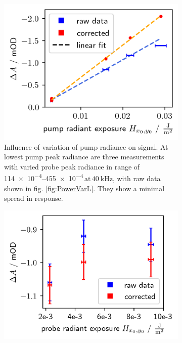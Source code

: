 \documentclass[twoside,openright]{scrreprt}
\def\frep#1{\ensuremath{\,\mathrm{at}\, \SI{#1}{\kilo\hertz}}}
\begin{document}
\begin{figure}[hbtp]
\begin{subfigure}[t]{0.5\linewidth}
\centering
\includegraphics[width=\linewidth]{images/PowerVariationCorrectedPump.png}
\caption{Influence of variation of pump radiance on signal. At lowest pump peak radiance are three measurements with varied probe peak radiance in range of \SIrange{114e-4}{455e-4}{\radExp}\frep{40}, with raw data shown in fig. \ref{fig:PowerVarL}. They show a minimal spread in response.}
\end{subfigure}\hfill
\begin{subfigure}[t]{0.5\linewidth}
\centering
\includegraphics[width=\linewidth]{images/PowerVariationCorrectedProbe.png}

\end{subfigure}
\end{figure}
\end{document}
